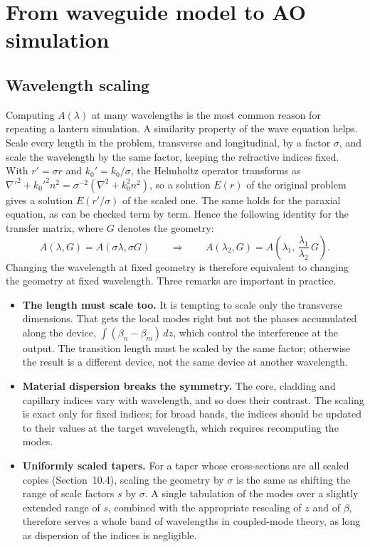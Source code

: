 \documentclass[11pt,a4paper]{article}
\begin{document}
\section{From waveguide model to AO simulation}

\subsection{Wavelength scaling}
Computing $A(\lambda)$ at many wavelengths is the most common reason for repeating a lantern simulation. A similarity property of the wave equation helps. Scale every length in the problem, transverse and longitudinal, by a factor $\sigma$, and scale the wavelength by the same factor, keeping the refractive indices fixed. With $r' = \sigma r$ and $k_0' = k_0/\sigma$, the Helmholtz operator transforms as $\nabla'^2 + k_0'^2 n^2 = \sigma^{-2}(\nabla^2 + k_0^2 n^2)$, so a solution $E(r)$ of the original problem gives a solution $E(r'/\sigma)$ of the scaled one. The same holds for the paraxial equation, as can be checked term by term. Hence the following identity for the transfer matrix, where $G$ denotes the geometry:
\begin{equation}
A(\lambda, G) = A(\sigma\lambda, \sigma G)
\qquad\Longrightarrow\qquad
A(\lambda_2, G) = A\!\left(\lambda_1,\, \frac{\lambda_1}{\lambda_2}\, G\right).
\label{eq:wavelength_scaling}
\end{equation}
Changing the wavelength at fixed geometry is therefore equivalent to changing the geometry at fixed wavelength. Three remarks are important in practice.
\begin{itemize}
\item \textbf{The length must scale too.} It is tempting to scale only the transverse dimensions. That gets the local modes right but not the phases accumulated along the device, $\int(\beta_n - \beta_m)\,dz$, which control the interference at the output. The transition length must be scaled by the same factor; otherwise the result is a different device, not the same device at another wavelength.
\item \textbf{Material dispersion breaks the symmetry.} The core, cladding and capillary indices vary with wavelength, and so does their contrast. The scaling is exact only for fixed indices; for broad bands, the indices should be updated to their values at the target wavelength, which requires recomputing the modes.
\item \textbf{Uniformly scaled tapers.} For a taper whose cross-sections are all scaled copies (Section~10.4), scaling the geometry by $\sigma$ is the same as shifting the range of scale factors $s$ by $\sigma$. A single tabulation of the modes over a slightly extended range of $s$, combined with the appropriate rescaling of $z$ and of $\beta$, therefore serves a whole band of wavelengths in coupled-mode theory, as long as dispersion of the indices is negligible.
\end{itemize}
\end{document}
